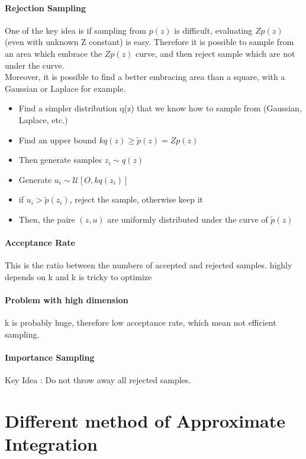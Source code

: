  			\paragraph*{Rejection Sampling}
 			One of the key idea is if sampling from $p(z)$ is difficult, evaluating $Z p(z)$ (even with unknown Z constant) is easy. Therefore it is possible to sample from an area which embrace the $Zp(z)$ curve, and then reject sample which are not under the curve. \\
 			Moreover, it is possible to find a better embracing area than a square, with a Gaussian or Laplace for example.
 			\begin{itemize}
 				\item Find a simpler distribution q(z) that we know how to sample from (Gaussian, Laplace, etc.)
 				\item Find an upper bound $kq(z) \geq \tilde{p}(z) = Z p(z)$
 				\item Then generate samples $z_i \sim q(z)$
 				\item Generate $u_i \sim \mathcal{U}[O, kq(z_i)]$
 				\item if $u_i > \tilde{p}(z_i)$, reject the sample, otherwise keep it
 				\item Then, the paire $(z, u)$ are uniformly distributed under the curve of $\tilde{p}(z)$
 			\end{itemize}

 			\paragraph*{Acceptance Rate}

 				This is the ratio between the numbers of accepted and rejected  samples. highly depends on k and k is tricky to optimize

 			\paragraph*{Problem with high dimension}

 				k is probably huge, therefore low acceptance rate, which mean not efficient sampling.

 			\paragraph*{Importance Sampling}
 				Key Idea : Do not throw away all rejected samples.


	\section{Different method of Approximate Integration}

